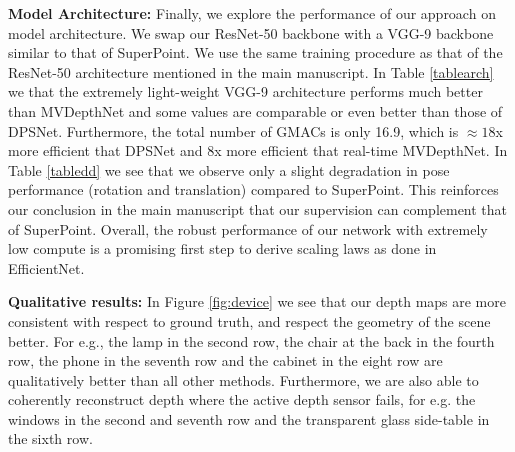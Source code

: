 \documentclass[runningheads]{llncs}
\begin{document}
\vspace{4mm}
\noindent
\textbf{Model Architecture:} Finally, we explore the performance of our approach on model architecture. We swap our ResNet-50 backbone with a VGG-9 backbone similar to that of SuperPoint. We use the same training procedure as that of the ResNet-50 architecture mentioned in the main manuscript. In Table \ref{tablearch} we that the extremely light-weight VGG-9 architecture performs much better than MVDepthNet and some values are comparable or even better than those of DPSNet. Furthermore, the total number of GMACs is only 16.9, which is $\approx 18$x more efficient that DPSNet and  $8$x more efficient that real-time MVDepthNet. In Table \ref{tabledd} we see that we observe only a slight degradation in pose performance (rotation and translation) compared to SuperPoint. This reinforces our conclusion in the main manuscript that our supervision can complement that of SuperPoint. Overall, the robust performance of our network with extremely low compute is a promising first step to derive scaling laws as done in EfficientNet.    

\vspace{4mm}
\noindent
\textbf{Qualitative results:} In Figure \ref{fig:device} we see that our depth maps are more consistent with respect to ground truth, and respect the geometry of the scene better. For e.g., the lamp in the second row, the chair at the back in the fourth row, the phone in the seventh row and the cabinet in the eight row are qualitatively better than all other methods. Furthermore, we are also able to coherently reconstruct depth where the active depth sensor fails, for e.g. the windows in the second and seventh row and the transparent glass side-table in the sixth row. 
\end{document}

